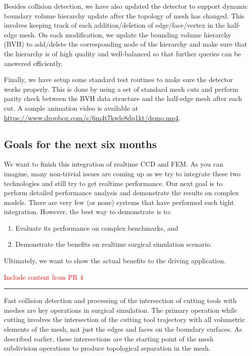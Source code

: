 Besides collision detection, we have also updated the detector to support dynamic boundary volume hierarchy update after the topology of mesh has changed. This involves keeping track of each addition/deletion of edge/face/vertex in the half-edge mesh. On each modification, we update the bounding volume hierarchy (BVH) to add/delete the corresponding node of the hierarchy and make sure that the hierarchy is of high quality and well-balanced so that further queries can be answered efficiently.

Finally, we have setup some standard test routines to make sure the detector works properly. This is done by using a set of standard mesh cuts and perform parity check between the BVH data structure and the half-edge mesh after each cut. A sample animation video is available at \url{https://www.dropbox.com/s/6m4t7kwle8dp1kt/demo.mp4}.

\subsection{Goals for the next six months}
We want to finish this integration of realtime CCD and FEM. As you can imagine, many non-trivial issues are coming up as we try to integrate these two technologies and still try to get realtime performance. Our next goal is to perform detailed performance analysis and demonstrate the results on complex models. There are very few (or none) systems that have performed such tight integration. However, the best way to demonstrate is to:

\begin{enumerate}[\em i\em)]
  \item Evaluate its performance on complex benchmarks, and
  \item Demonstrate the benefits on realtime surgical simulation scenario.
\end{enumerate}

Ultimately, we want to show the actual benefits to the driving application.

\textcolor{Red}{Include content from PR 4 }

\hrule%

Fast collision detection and processing of the intersection of cutting tools with meshes are key operations in surgical simulation. The primary operation while cutting involves the intersection of the cutting tool trajectory with all volumetric elements of the mesh, not just the edges and faces on the boundary surfaces. As described earlier, these intersections are the starting point of the mesh subdivision operations to produce topological separation in the mesh.

